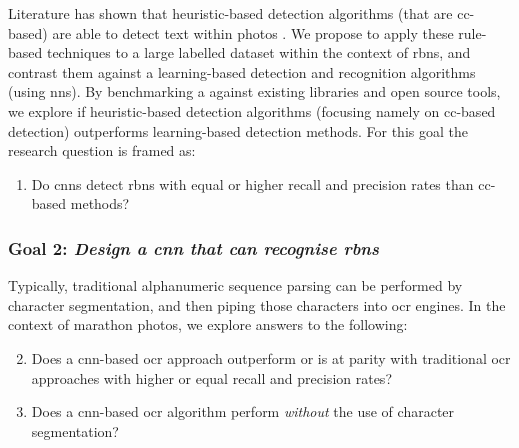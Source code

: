 Literature has shown that heuristic-based detection algorithms (that are \gls{cc}-based) are able to detect text within photos \citep{Li:2012wd, Chen:2011ul, Eichner:2008dw}. We propose to apply these rule-based techniques to a large labelled dataset within the context of \glspl{rbn}, and contrast them against a learning-based detection and recognition algorithms (using \glspl{nn}). By benchmarking a against existing libraries and open source tools, we explore if heuristic-based detection algorithms (focusing namely on \gls{cc}-based detection) outperforms learning-based detection methods.
For this goal the research question is framed as:
\begin{enumerate}[label=\bfseries~RQ\arabic*), leftmargin=2cm, rightmargin=1.5cm]
  \item\label{rq:1} Do \glspl{cnn} detect \glspl{rbn} with equal or higher recall and precision rates than \gls{cc}-based methods?
\end{enumerate}

\subsubsection*{Goal 2: \itshape Design a \gls{cnn} that can recognise \glspl{rbn}}

Typically, traditional alphanumeric sequence parsing can be performed by character segmentation, and then piping those characters into \gls{ocr} engines.
In the context of marathon photos, we explore answers to the following:
\begin{enumerate}[label=\bfseries~RQ\arabic*), leftmargin=2cm, rightmargin=1.5cm]
  \setcounter{enumi}{1}
  \item\label{rq:2} Does a \gls{cnn}-based \gls{ocr} approach outperform or is at parity with traditional \gls{ocr} approaches with higher or equal recall and precision rates?
  \item\label{rq:3} Does a \gls{cnn}-based \gls{ocr} algorithm perform \textit{without} the use of character segmentation?
\end{enumerate}

